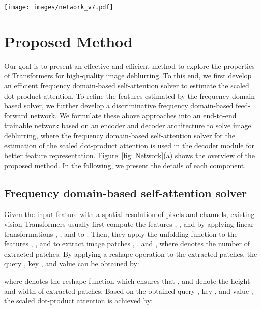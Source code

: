 \documentclass[10pt,twocolumn,letterpaper]{article}
\begin{document}
\begin{figure*}[thbp]
    \centering
 \texttt{[image: images/network\_v7.pdf]}
 \vspace{-1mm}
 \caption{Network architectures. (a) The proposed asymmetric encoder-decoder network that only contains DFFN in the encoder module and both FSAS and DFFN in the decoder module for image deblurring. (b) The proposed FSAS module. (c) The proposed DFFN module.}
 \label{fig: Network}
 \vspace{-4mm}
\end{figure*}



\section{Proposed Method}

Our goal is to present an effective and efficient method to explore the properties of Transformers for high-quality image deblurring.
To this end, we first develop an efficient frequency domain-based self-attention solver to estimate the scaled dot-product attention. To refine the features estimated by the frequency domain-based solver, we further develop a discriminative frequency domain-based feed-forward network.
We formulate these above approaches into an end-to-end trainable network based on an encoder and decoder architecture to solve image deblurring, where the frequency domain-based self-attention solver for the estimation of the scaled dot-product attention is used in the decoder module for better feature representation.
Figure~\ref{fig: Network}(a) shows the overview of the proposed method. In the following, we present the details of each component.


\subsection{Frequency domain-based self-attention solver}
Given the input feature  with a spatial resolution of  pixels and  channels, existing vision Transformers usually first compute the features , , and  by applying linear transformations , , and  to .
Then, they apply the unfolding function to the features , , and  to extract image patches , , and , where  denotes the number of extracted patches.
By applying a reshape operation to the extracted patches, the query , key , and value  can be obtained by:

where  denotes the reshape function which ensures that ,  and  denote the height and width of extracted patches.
Based on the obtained query , key , and value , the scaled dot-product attention is achieved by:
\end{document}
